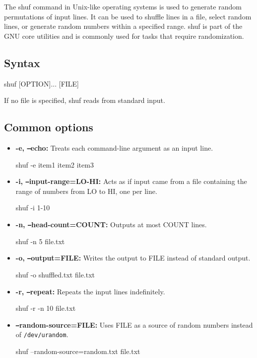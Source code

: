 \documentclass{report}
\begin{document}
    \pagebreak 
    \bigbreak \noindent     
    The shuf command in Unix-like operating systems is used to generate random permutations of input lines. It can be used to shuffle lines in a file, select random lines, or generate random numbers within a specified range. shuf is part of the GNU core utilities and is commonly used for tasks that require randomization.
    \bigbreak \noindent 
    \subsection{Syntax}
    \bigbreak \noindent 
    \begin{bashcode}
    shuf [OPTION]... [FILE]
    \end{bashcode}
    \bigbreak \noindent 
    If no file is specified, shuf reads from standard input.
    \bigbreak \noindent 
    \subsection{Common options}
    \begin{itemize}
        \item \textbf{-e, \texttt{--}echo:} Treats each command-line argument as an input line.
            \bigbreak \noindent
            \begin{bashcode}
                shuf -e item1 item2 item3
            \end{bashcode}
        \item \textbf{-i, \texttt{--}input-range=LO-HI:} Acts as if input came from a file containing the range of numbers from LO to HI, one per line.
            \bigbreak \noindent
            \begin{bashcode}
                shuf -i 1-10
            \end{bashcode}
        \item \textbf{-n, \texttt{--}head-count=COUNT:} Outputs at most COUNT lines.
            \bigbreak \noindent
            \begin{bashcode}
                shuf -n 5 file.txt
            \end{bashcode}
        \item \textbf{-o, \texttt{--}output=FILE:} Writes the output to FILE instead of standard output.
            \bigbreak \noindent
            \begin{bashcode}
                shuf -o shuffled.txt file.txt
            \end{bashcode}
        \item \textbf{-r, \texttt{--}repeat:} Repeats the input lines indefinitely.
            \bigbreak \noindent
            \begin{bashcode}
                shuf -r -n 10 file.txt
            \end{bashcode}
        \item \textbf{\texttt{--}random-source=FILE:} Uses FILE as a source of random numbers instead of \texttt{/dev/urandom}.
            \bigbreak \noindent
            \begin{bashcode}
                shuf --random-source=random.txt file.txt
            \end{bashcode}
    \end{itemize}
\end{document}
